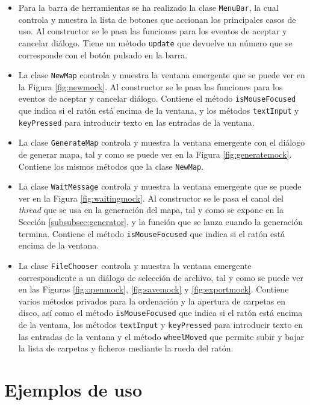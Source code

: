 \begin{itemize}
	\item Para la barra de herramientas se ha realizado la clase \texttt{MenuBar}, la cual controla y muestra la lista de botones que accionan los principales casos de uso. Al constructor se le pasa las funciones para los eventos de aceptar y cancelar diálogo. Tiene un método \texttt{update} que devuelve un número que se corresponde con el botón pulsado en la barra.
	\item La clase \texttt{NewMap} controla y muestra la ventana emergente que se puede ver en la Figura \ref{fig:newmock}. Al constructor se le pasa las funciones para los eventos de aceptar y cancelar diálogo. Contiene el método \texttt{isMouseFocused} que indica si el ratón está encima de la ventana, y los métodos \texttt{textInput} y \texttt{keyPressed} para introducir texto en las entradas de la ventana.
	\item La clase \texttt{GenerateMap} controla y muestra la ventana emergente con el diálogo de generar mapa, tal y como se puede ver en la Figura \ref{fig:generatemock}. Contiene los mismos métodos que la clase \texttt{NewMap}.
	\item La clase \texttt{WaitMessage} controla y muestra la ventana emergente que se puede ver en la Figura \ref{fig:waitingmock}. Al constructor se le pasa el canal del \textit{thread} que se usa en la generación del mapa, tal y como se expone en la Sección \ref{subsubsec:generator}, y la función que se lanza cuando la generación termina. Contiene el método \texttt{isMouseFocused} que indica si el ratón está encima de la ventana.
	\item La clase \texttt{FileChooser} controla y muestra la ventana emergente correspondiente a un diálogo de selección de archivo, tal y como se puede ver en las Figuras \ref{fig:openmock}, \ref{fig:savemock} y \ref{fig:exportmock}. Contiene varios métodos privados para la ordenación y la apertura de carpetas en disco, así como el método \texttt{isMouseFocused} que indica si el ratón está encima de la ventana, los métodos \texttt{textInput} y \texttt{keyPressed} para introducir texto en las entradas de la ventana y el método \texttt{wheelMoved} que permite subir y bajar la lista de carpetas y ficheros mediante la rueda del ratón.
\end{itemize}

\section{Ejemplos de uso}

